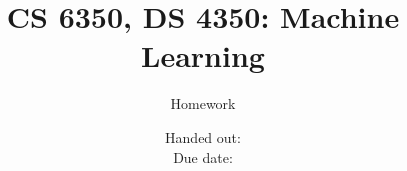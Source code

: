 \documentclass[12pt, fullpage,letterpaper]{article}
\title{CS 6350, DS 4350: Machine Learning \semester}
\author{Homework \assignmentId}
\date{Handed out: \releaseDate\\
  Due date: \dueDate}
\begin{document}
\maketitle



\pagebreak



\pagebreak



\pagebreak


\end{document}
